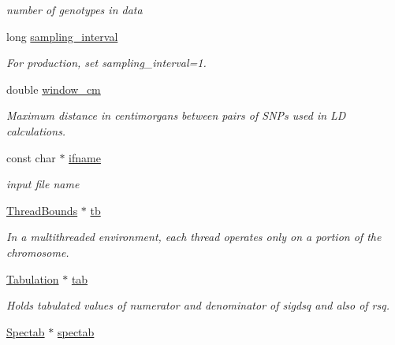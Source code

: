 \begin{DoxyCompactItemize}
\begin{DoxyCompactList}\small\item\em number of genotypes in data \end{DoxyCompactList}\item 
long \hyperlink{struct_thread_arg_ac82e3148f3f1efd2ad66f235afd1f5e5}{sampling\-\_\-interval}
\begin{DoxyCompactList}\small\item\em \-For production, set sampling\-\_\-interval=1. \end{DoxyCompactList}\item 
\hypertarget{struct_thread_arg_a7142e5de7bd8476071e81684ac1308d5}{double \hyperlink{struct_thread_arg_a7142e5de7bd8476071e81684ac1308d5}{window\-\_\-cm}}\label{struct_thread_arg_a7142e5de7bd8476071e81684ac1308d5}

\begin{DoxyCompactList}\small\item\em \-Maximum distance in centimorgans between pairs of \-S\-N\-Ps used in \-L\-D calculations. \end{DoxyCompactList}\item 
\hypertarget{struct_thread_arg_adbcae7a07143652c9ce5a56e66607e4e}{const char $\ast$ \hyperlink{struct_thread_arg_adbcae7a07143652c9ce5a56e66607e4e}{ifname}}\label{struct_thread_arg_adbcae7a07143652c9ce5a56e66607e4e}

\begin{DoxyCompactList}\small\item\em input file name \end{DoxyCompactList}\item 
\hyperlink{struct_thread_bounds}{\-Thread\-Bounds} $\ast$ \hyperlink{struct_thread_arg_a7078358812327f5b261c8b7b48d02b7f}{tb}
\begin{DoxyCompactList}\small\item\em \-In a multithreaded environment, each thread operates only on a portion of the chromosome. \end{DoxyCompactList}\item 
\hyperlink{struct_tabulation}{\-Tabulation} $\ast$ \hyperlink{struct_thread_arg_a4a020cb6c5951bbe5d51af918d1fe0dd}{tab}
\begin{DoxyCompactList}\small\item\em \-Holds tabulated values of numerator and denominator of sigdsq and also of rsq. \end{DoxyCompactList}\item 
\hypertarget{struct_thread_arg_abca5bd7367b6b35070f52b3523e81b30}{\hyperlink{struct_spectab}{\-Spectab} $\ast$ \hyperlink{struct_thread_arg_abca5bd7367b6b35070f52b3523e81b30}{spectab}}\label{struct_thread_arg_abca5bd7367b6b35070f52b3523e81b30}


\end{DoxyCompactItemize}
